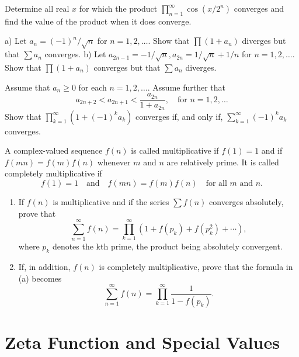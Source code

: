 \begin{problembox}
Determine all real \(x\) for which the product \(\prod_{n=1}^{\infty} \cos (x/2^n)\) converges and find the value of the product when it does converge.
\end{problembox}



\begin{problembox}
a) Let \(a_n = (-1)^n/\sqrt{n}\) for \(n = 1, 2, \ldots\). Show that \(\prod (1 + a_n)\) diverges but that \(\sum a_n\) converges.
b) Let \(a_{2n-1} = -1/\sqrt{n}, a_{2n} = 1/\sqrt{n} + 1/n\) for \(n = 1, 2, \ldots\). Show that \(\prod (1 + a_n)\) converges but that \(\sum a_n\) diverges.
\end{problembox}



\begin{problembox}
Assume that \(a_n \geq 0\) for each \(n = 1, 2, \ldots\). Assume further that
\[a_{2n+2} < a_{2n+1} < \frac{a_{2n}}{1 + a_{2n}}, \quad \text{for } n = 1, 2, \ldots\]
Show that \(\prod_{k=1}^{\infty} (1 + (-1)^k a_k)\) converges if, and only if, \(\sum_{k=1}^{\infty} (-1)^k a_k\) converges.
\end{problembox}



\begin{problembox}
A complex-valued sequence \(f(n)\) is called multiplicative if \(f(1) = 1\) and if \(f(mn) = f(m)f(n)\) whenever \(m\) and \(n\) are relatively prime. It is called completely multiplicative if
\[f(1) = 1 \quad \text{and} \quad f(mn) = f(m)f(n) \quad \text{for all } m \text{ and } n.\]
\begin{enumerate}[label=\alph*)]
\item If \(f(n)\) is multiplicative and if the series \(\sum f(n)\) converges absolutely, prove that
\[\sum_{n=1}^{\infty} f(n) = \prod_{k=1}^{\infty} (1 + f(p_k) + f(p_k^2) + \cdots),\]
where \(p_k\) denotes the kth prime, the product being absolutely convergent.
\item If, in addition, \(f(n)\) is completely multiplicative, prove that the formula in (a) becomes
\[\sum_{n=1}^{\infty} f(n) = \prod_{k=1}^{\infty} \frac{1}{1 - f(p_k)}.\]
\end{enumerate}
\end{problembox}

\section{Zeta Function and Special Values}



